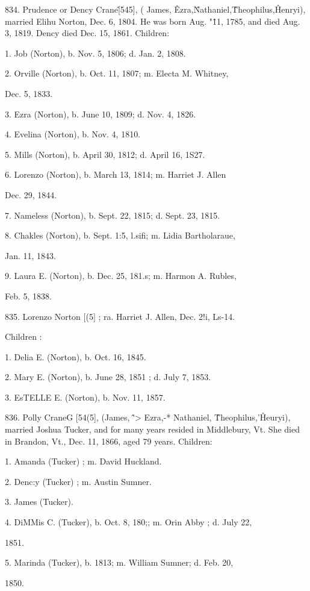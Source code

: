 \documentclass{book}
\begin{document}
834. Prudence or Dency Crane\^ [545], ( James, \^ Ezra,\^ 
Nathaniel,\^ Theophilus,\^ Henryi), married Elihu Norton, Dec. 
6, 1804. He was born Aug. "\^11, 1785, and died Aug. 3, 1819. 
Dency died Dec. 15, 1861. Children: 

1. Job (Norton), b. Nov. 5, 1806; d. Jan. 2, 1808. 

2. Orville (Norton), b. Oct. 11, 1807; m. Electa M. Whitney, 

Dec. 5, 1833. 

3. Ezra (Norton), b. June 10, 1809; d. Nov. 4, 1826. 

4. Evelina (Norton), b. Nov. 4, 1810. 

5. Mills (Norton), b. April 30, 1812; d. April 16, 1S27. 

6. Lorenzo (Norton), b. March 13, 1814; m. Harriet J. Allen 

Dec. 29, 1844. 

7. Nameless (Norton), b. Sept. 22, 1815; d. Sept. 23, 1815. 




8. Chakles (Norton), b. Sept. 1:5, l.sifi; m. Lidia Bartholaraue, 

Jan. 11, 1843. 

9. Laura E. (Norton), b. Dec. 25, 181.s; m. Harmon A. Rubles, 

Feb. 5, 1838. 

835. Lorenzo Norton [(5] ; ra. Harriet J. Allen, Dec. 2!i, Ls-14. 

Children : 

1. Delia E. (Norton), b. Oct. 16, 1845. 

2. Mary E. (Norton), b. June 28, 1851 ; d. July 7, 1853. 

3. EsTELLE E. (Norton), b. Nov. 11, 1857. 

836. Polly CraneG [54(5], (James, \^'> Ezra,-* Nathaniel, \^ 
Theophilus,'\^ Heuryi), married Joshua Tucker, and for many 
years resided in Middlebury, Vt. She died in Brandon, Vt., 
Dec. 11, 1866, aged 79 years. Children: 

1. Amanda (Tucker) ; m. David Huckland. 

2. Denc:y (Tucker) ; m. Austin Sumner. 

3. James (Tucker). 

4. DiMMis C. (Tucker), b. Oct. 8, 180;; m. Orin Abby ; d. July 22, 

1851. 

5. Marinda (Tucker), b. 1813; m. William Sumner; d. Feb. 20, 

1850. 
\end{document}
